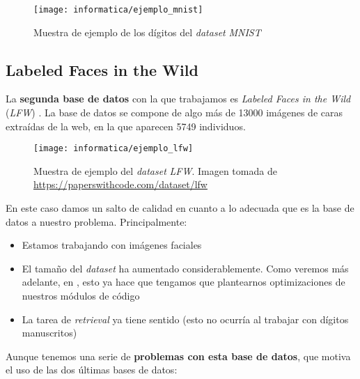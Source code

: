 \begin{figure}[H]
    \centering
    \texttt{[image: informatica/ejemplo\_mnist]}
    \caption{Muestra de ejemplo de los dígitos del \textit{dataset} \textit{MNIST}}
\end{figure}


\subsection{Labeled Faces in the Wild}

La \textbf{segunda base de datos} con la que trabajamos es \textit{Labeled Faces in the Wild} (\textit{LFW}) \cite{informatica:lfw_dataset}. La base de datos se compone de algo más de 13000 imágenes de caras extraídas de la web, en la que aparecen 5749 individuos.

\begin{figure}[H]
    \centering
    \texttt{[image: informatica/ejemplo\_lfw]}
    \caption{Muestra de ejemplo del \textit{dataset} \textit{LFW}. Imagen tomada de \url{https://paperswithcode.com/dataset/lfw}}
\end{figure}

En este caso damos un salto de calidad en cuanto a lo adecuada que es la base de datos a nuestro problema. Principalmente:

\begin{itemize}
    \item Estamos trabajando con imágenes faciales
    \item El tamaño del \textit{dataset} ha aumentado considerablemente. Como veremos más adelante, en , esto ya hace que tengamos que plantearnos optimizaciones de nuestros módulos de código
    \item La tarea de \textit{retrieval} ya tiene sentido (esto no ocurría al trabajar con dígitos manuscritos)
\end{itemize}

Aunque tenemos una serie de \textbf{problemas con esta base de datos}, que motiva el uso de las dos últimas bases de datos:

